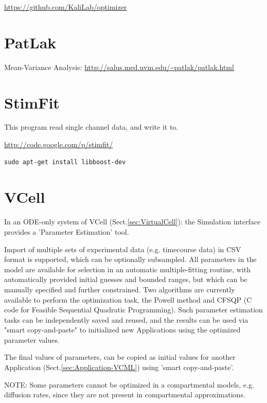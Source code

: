 \url{https://github.com/KaliLab/optimizer}



\section{PatLak}
\label{sec:PatLak}

Mean-Variance Analysis:
\url{http://salus.med.uvm.edu/~patlak/patlak.html}


\section{StimFit}
\label{sec:StimFit}

This program read single channel data, and write it to.

\url{http://code.google.com/p/stimfit/}

\begin{verbatim}
sudo apt-get install libboost-dev
\end{verbatim}


\section{VCell}
\label{sec:parameter-search-VCell}

In an ODE-only system of VCell (Sect.\ref{sec:VirtualCell}): the Simulation
interface provides a 'Parameter Estimation' tool.

Import of multiple sets of experimental data (e.g. timecourse data) in CSV
format is supported, which can be optionally subsampled. All parameters in the
model are available for selection in an automatic multiple-fitting routine, with
automatically provided initial guesses and bounded ranges, but which can be
manually specified and further constrained. Two algorithms are currently
available to perform the optimization task, the Powell method and CFSQP (C code
for Feasible Sequential Quadratic Programming). Such parameter estimation tasks
can be independently saved and reused, and the results can be used via "smart
copy-and-paste" to initialized new Applications using the optimized parameter
values.

The final values of parameters, can be copied as initial values for another
Application (Sect.\ref{sec:Application-VCML})
using 'smart copy-and-paste'.

NOTE: Some parameters cannot be optimized in a compartmental models,
e.g. diffusion rates, since they are not present in compartmental
approximations.


